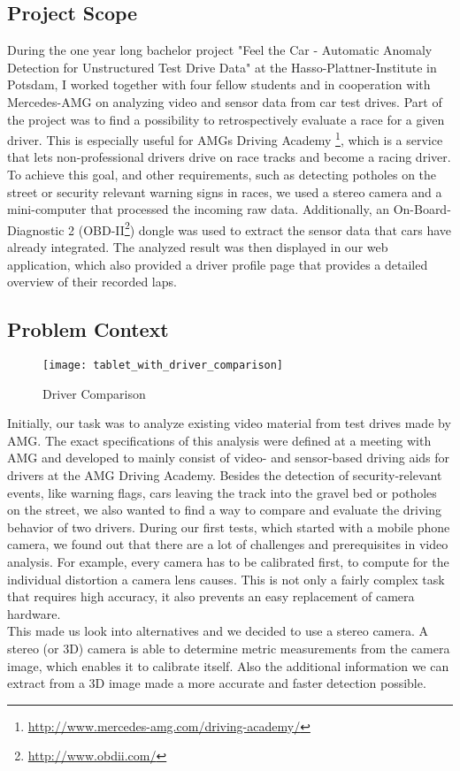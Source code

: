 \subsection{Project Scope}
During the one year long bachelor project "Feel the Car - Automatic A\-no\-ma\-ly Detection for Unstructured Test Drive Data" at the Hasso-Plattner-Institute in Potsdam, I worked together with four fellow students and in cooperation with Mercedes-AMG on analyzing video and sensor data from car test drives.
Part of the project was to find a possibility to retrospectively evaluate a race for a given driver. This is especially useful for AMGs Driving Academy \footnote{\url{http://www.mercedes-amg.com/driving-academy/}}, which is a service that lets non-professional drivers drive on race tracks and become a racing driver.\\
To achieve this goal, and other requirements, such as detecting potholes on the street or security relevant warning signs in races, we used a stereo camera and a mini-computer that processed the incoming raw data.
Additionally, an On-Board-Diagnostic 2 (OBD-II\footnote{\url{http://www.obdii.com/}}) dongle was used to extract the sensor data that cars have already integrated.
The analyzed result was then displayed in our web application, which also provided a driver profile page that provides a detailed overview of their recorded laps.
\clearpage

\subsection{Problem Context}
\label{sec:context}

\begin{figure}[!ht]
	\centering
	\texttt{[image: tablet\_with\_driver\_comparison]}
	\caption{Driver Comparison}
	\label{fig:comparison_with_overlay}
\end{figure}

Initially, our task was to analyze existing video material from test drives made by AMG. The exact specifications of this analysis were defined at a meeting with AMG and developed to mainly consist of video- and sensor-based driving aids for drivers at the AMG Driving Academy. Besides the detection of security-relevant events, like warning flags, cars leaving the track into the gravel bed or potholes on the street, we also wanted to find a way to compare and evaluate the driving behavior of two drivers.
During our first tests, which started with a mobile phone camera, we found out that there are a lot of challenges and prerequisites in video analysis. For example, every camera has to be calibrated first, to compute for the individual distortion a camera lens causes. This is not only a fairly complex task that requires high accuracy, it also prevents an easy replacement of camera hardware.\\
This made us look into alternatives and we decided to use a stereo camera. A stereo (or 3D) camera is able to determine metric measurements from the camera image, which enables it to calibrate itself. Also the additional information we can extract from a 3D image made a more accurate and faster detection possible.\\

